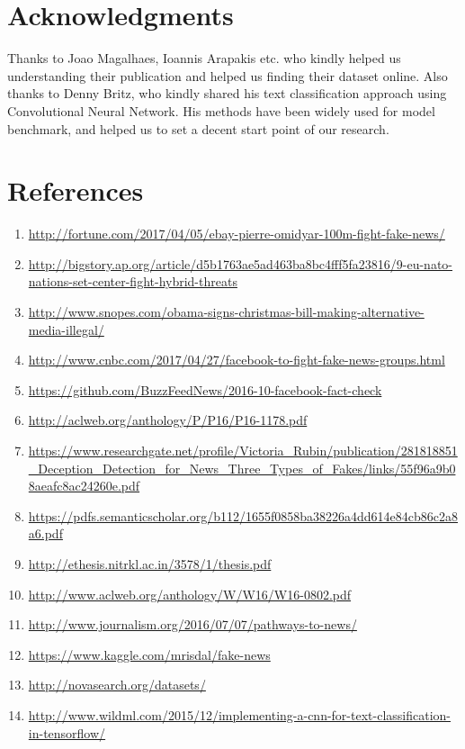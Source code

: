\documentclass[11pt]{article}
\begin{document}
\section*{Acknowledgments}

\indent \indent Thanks to Joao Magalhaes, Ioannis Arapakis etc. who kindly helped us understanding their publication and helped us finding their dataset online. Also thanks to Denny Britz, who kindly shared his text classification approach using Convolutional Neural Network. His methods have been widely used for model benchmark, and helped us to set a decent start point of our research. 

\section*{References }

\begin{enumerate}
	\item \url{http://fortune.com/2017/04/05/ebay-pierre-omidyar-100m-fight-fake-news/} 
	\item \url{http://bigstory.ap.org/article/d5b1763ae5ad463ba8bc4fff5fa23816/9-eu-nato-nations-set-center-fight-hybrid-threats}
	\item \url{http://www.snopes.com/obama-signs-christmas-bill-making-alternative-media-illegal/} 
	\item \url{http://www.cnbc.com/2017/04/27/facebook-to-fight-fake-news-groups.html}
	\item \url{https://github.com/BuzzFeedNews/2016-10-facebook-fact-check}
	\item \url{http://aclweb.org/anthology/P/P16/P16-1178.pdf}
	\item \url{https://www.researchgate.net/profile/Victoria_Rubin/publication/281818851_Deception_Detection_for_News_Three_Types_of_Fakes/links/55f96a9b08aeafc8ac24260e.pdf}
	\item \url{https://pdfs.semanticscholar.org/b112/1655f0858ba38226a4dd614e84cb86c2a8a6.pdf}
	\item \url{http://ethesis.nitrkl.ac.in/3578/1/thesis.pdf}
	\item \url{http://www.aclweb.org/anthology/W/W16/W16-0802.pdf}
	\item \url{http://www.journalism.org/2016/07/07/pathways-to-news/ }
	\item \url{https://www.kaggle.com/mrisdal/fake-news}
	\item \url{http://novasearch.org/datasets/ }
	\item \url{http://www.wildml.com/2015/12/implementing-a-cnn-for-text-classification-in-tensorflow/ }
\end{enumerate}
\end{document}
